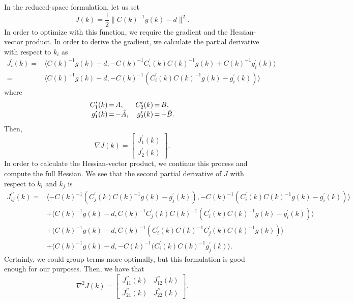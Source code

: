 \documentclass{report}
\begin{document}
        In the reduced-space formulation, let us set
$$
    J(k) = \frac{1}{2} \| C(k)^{-1}g(k) - d \|^2.
$$
In order to optimize with this function, we require the gradient and the Hessian-vector product.  In order to derive the gradient, we calculate the partial derivative with respect to $k_i$ as
\begin{align*}
    J^\prime_i(k)
    =& \langle C(k)^{-1}g(k) - d, -C(k)^{-1} C^\prime_i(k) C(k)^{-1}g(k) + C(k)^{-1}g^\prime_i(k)\rangle\\
    =& \langle C(k)^{-1}g(k) - d, -C(k)^{-1} (C^\prime_i(k) C(k)^{-1}g(k) - g^\prime_i(k))\rangle
\end{align*}
where
$$\begin{array}{r@{\,=\,}lr@{\,=\,}l}
        C^\prime_1(k) & A,&
        C^\prime_2(k) & B,\\
        g^\prime_1(k) & -\hat{A},&
        g^\prime_2(k) & -\hat{B}.
\end{array}$$
Then,
$$
        \nabla J(k) = \begin{bmatrix}
                J^\prime_1(k)\\
                J^\prime_2(k)
            \end{bmatrix}.
$$
In order to calculate the Hessian-vector product, we continue this process and compute the full Hessian.  We see that the second partial derivative of $J$ with respect to $k_i$ and $k_j$ is
\begin{align*}
    J^{\prime\prime}_{ij}(k)
        =& \langle -C(k)^{-1} (C^\prime_j(k) C(k)^{-1}g(k) - g^\prime_j(k)), -C(k)^{-1} (C^\prime_i(k) C(k)^{-1}g(k) - g^\prime_i(k))\rangle\\
        &+ \langle C(k)^{-1}g(k) - d, C(k)^{-1} C^\prime_j(k) C(k)^{-1}(C^\prime_i(k) C(k)^{-1}g(k) - g^\prime_i(k))\rangle\\
        &+ \langle C(k)^{-1}g(k) - d, C(k)^{-1}(C^\prime_i(k) C(k)^{-1}C^\prime_j(k)C(k)^{-1}g(k))\rangle\\
        &+ \langle C(k)^{-1}g(k) - d, -C(k)^{-1}(C^\prime_i(k) C(k)^{-1}g^\prime_j(k)\rangle.
\end{align*}
Certainly, we could group terms more optimally, but this formulation is good enough for our purposes.  Then, we have that
$$
        \nabla^2 J(k) = \begin{bmatrix}
                J^{\prime\prime}_{11}(k) & J^{\prime\prime}_{12}(k)\\
                J^{\prime\prime}_{21}(k) & J^{\prime\prime}_{22}(k)
            \end{bmatrix}.
$$
\end{document}
